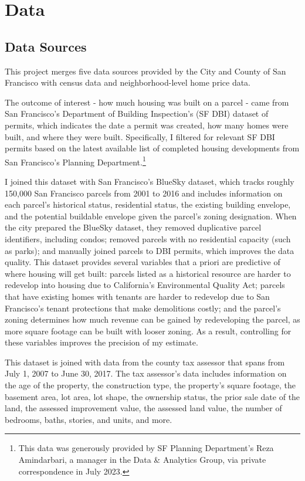 \documentclass[a4paper,12pt]{article}
\begin{document}
\section{Data}

\subsection{Data Sources}
\label{data.sources} 


This project merges five data sources provided by the City and County of San Francisco with census data and neighborhood-level home price data.

The outcome of interest - how much housing was built on a parcel - came from San Francisco's Department of Building Inspection's (SF DBI) dataset of permits, which indicates the date a permit was created, how many homes were built, and where they were built. Specifically, I filtered for relevant SF DBI permits based on the latest available list of completed housing developments from San Francisco's Planning Department.\footnote{This data was generously provided by SF Planning Department's Reza Amindarbari, a manager in the Data \& Analytics Group, via private correspondence in July 2023.}

I joined this dataset with San Francisco's BlueSky dataset, which tracks roughly 150,000 San Francisco parcels from 2001 to 2016 and includes information on each parcel's historical status, residential status, the existing building envelope, and the potential buildable envelope given the parcel's zoning designation.\cite{SFHousingElement2022AppendixB} When the city prepared the BlueSky dataset, they removed duplicative parcel identifiers, including condos; removed parcels with no residential capacity (such as parks); and manually joined parcels to DBI permits, which improves the data quality. This dataset provides several variables that a priori are predictive of where housing will get built: parcels listed as a historical resource are harder to redevelop into housing due to California's Environmental Quality Act; parcels that have existing homes with tenants are harder to redevelop due to San Francisco's tenant protections that make demolitions costly; and the parcel's zoning determines how much revenue can be gained by redeveloping the parcel, as more square footage can be built with looser zoning. As a result, controlling for these variables improves the precision of my estimate.

This dataset is joined with data from the county tax assessor that spans from July 1, 2007 to June 30, 2017. The tax assessor's data includes information on the age of the property, the construction type, the property's square footage, the basement area, lot area, lot shape, the ownership status, the prior sale date of the land, the assessed improvement value, the assessed land value, the number of bedrooms, baths, stories, and units, and more.  
\end{document}
